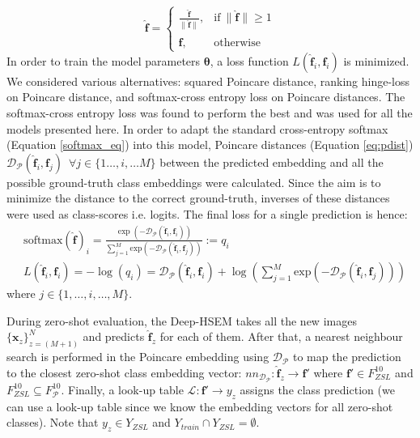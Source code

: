 \documentclass[12pt]{report}
\begin{document}
\begin{equation}
\mathbf{\hat{f}} =
\begin{cases}
   \frac{\mathbf{\hat{f}}}{\lVert\mathbf{\hat{f}}\rVert}, & \text{if}\ \lVert\mathbf{\hat{f}}\rVert \geq 1 \\
   \mathbf{\hat{f}}, & \text{otherwise} 
\end{cases}
\end{equation}
In order to train the model parameters $\pmb{\theta}$, a loss function $L(\mathbf{\hat{f}}_i, \mathbf{f}_i)$ is minimized. We considered various alternatives: squared Poincare distance, ranking hinge-loss on Poincare distance, and softmax-cross entropy loss on Poincare distances. The softmax-cross entropy loss was found to perform the best and was used for all the models presented here. In order to adapt the standard cross-entropy softmax (Equation \ref{softmax_eq}) into this model, Poincare distances (Equation \ref{eq:pdist}) $\mathcal{D_{\mathcal{P}}}(\mathbf{\hat{f}}_i, \mathbf{f}_j) \,\,\, \forall j \in \{1\dots,i,\dots M\}$  between the predicted embedding and all the possible ground-truth class embeddings were calculated. Since the aim is to minimize the distance to the correct ground-truth, inverses of these distances were used as class-scores i.e. logits. The final loss for a single prediction is hence:
\begin{align} \label{softmax_eq_poinc}
& \text{softmax}(\mathbf{\hat{f}})_i = \frac{\exp (-\mathcal{D_{\mathcal{P}}}(\mathbf{\hat{f}}_i, \mathbf{f}_i))}{\sum_{j=1}^M \text{exp}(-\mathcal{D_{\mathcal{P}}}(\mathbf{\hat{f}}_i, \mathbf{f}_j))} := q_i \\
& L(\mathbf{\hat{f}}_i, \mathbf{f}_i)  = -\log \left(q_i\right) = \mathcal{D_{\mathcal{P}}}(\mathbf{\hat{f}}_i, \mathbf{f}_i) + \log\left(\sum_{j=1}^M \text{exp}(-\mathcal{D_{\mathcal{P}}}(\mathbf{\hat{f}}_i, \mathbf{f}_j))\right)
\end{align}
where $j \in \{1,\dots,i,\dots,M\}$. 

During zero-shot evaluation, the Deep-HSEM takes all the new images $\{\mathbf{x}_z\}_{z=(M+1)}^N$ and predicts $\mathbf{\hat{f}}_z$ for each of them. After that, a nearest neighbour search is performed in the Poincare embedding using $\mathcal{D_{\mathcal{P}}}$ to map the prediction to the closest zero-shot class embedding vector: $nn_{\mathcal{D}_{\mathcal{P}}}: \mathbf{\hat{f}}_z \rightarrow \mathbf{f'}$ where $\mathbf{f'} \in F_{ZSL}^{10}$ and $F_{ZSL}^{10} \subseteq F_{\mathcal{P}}^{10}$. Finally, a look-up table $\mathcal{L}: \mathbf{f'} \rightarrow y_{z}$ assigns the class prediction (we can use a look-up table since we know the embedding vectors for all zero-shot classes). Note that $y_z \in Y_{ZSL}$ and $Y_{train}\cap Y_{ZSL}=\emptyset$.
\end{document}
